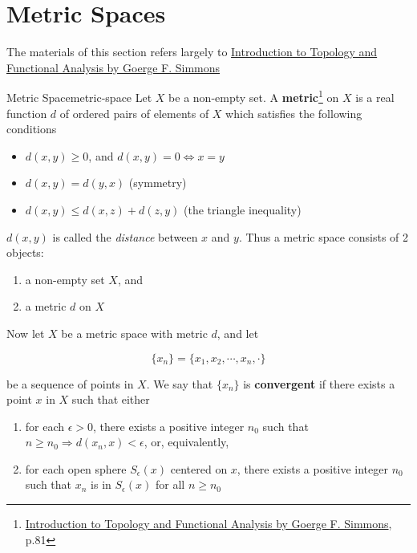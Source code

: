 \section{Metric Spaces}

\begin{tcolorbox}[enhanced,arc=3mm,boxrule=1.5mm,
    frame hidden,colback=blue!10!white,
    borderline={1mm}{0mm}{blue,dotted} ]
    The materials of this section refers largely to
    \href{https://trello.com/c/3EPccNTa}{Introduction to Topology and Functional Analysis by Goerge F. Simmons}
\end{tcolorbox}

\begin{Definition}{Metric Space}{metric-space}
    Let $X$ be a non-empty set. A \textbf{metric}\footnote{\href{https://trello.com/c/3EPccNTa}{Introduction to Topology and Functional Analysis by Goerge F. Simmons}, p.81}
    on $X$ is a real function $d$ of ordered pairs of elements of $X$ which satisfies the following conditions

    \begin{itemize}
        \item $d(x, y) \ge 0$, and $d(x, y) = 0 \iff x = y$
        \item $d(x, y) = d(y, x)$ (symmetry)
        \item $d(x, y) \le d(x, z) + d(z, y)$ (the triangle inequality)
    \end{itemize}
\end{Definition}

$d(x, y)$ is called the \textit{distance} between $x$ and $y$. Thus a metric space consists of 2 objects:

\begin{enumerate}
    \item a non-empty set $X$, and
    \item a metric $d$ on $X$
\end{enumerate}

Now let $X$ be a metric space with metric $d$, and let

\begin{equation}
    \{ x_n \} = \{ x_1, x_2, \cdots, x_n, \cdot \}
\end{equation}

be a sequence of points in $X$. We say that $\{ x_n \}$ is \textbf{convergent} if there exists a point $x$ in $X$ such
that either

\begin{enumerate}
    \item for each $\epsilon > 0$, there exists a positive integer $n_0$ such that $n \ge n_0 \Rightarrow d(x_n, x) < \epsilon$,
          or, equivalently,
    \item for each open sphere $S_{\epsilon}(x)$ centered on $x$, there exists a positive integer $n_0$ such that $x_n$
          is in $S_{\epsilon}(x)$ for all $n \ge n_0$
\end{enumerate}

